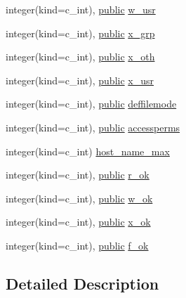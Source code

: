 \begin{DoxyCompactItemize}
\item 
integer(kind=c\+\_\+int), \hyperlink{M__stopwatch_83_8txt_a2f74811300c361e53b430611a7d1769f}{public} \hyperlink{namespacem__system_a7d9b4b9dbb20baaf8793f8fa07f7e0bc}{w\+\_\+usr}
\item 
integer(kind=c\+\_\+int), \hyperlink{M__stopwatch_83_8txt_a2f74811300c361e53b430611a7d1769f}{public} \hyperlink{namespacem__system_ad6577311415ac3c4a747b5cbbbfe1c2b}{x\+\_\+grp}
\item 
integer(kind=c\+\_\+int), \hyperlink{M__stopwatch_83_8txt_a2f74811300c361e53b430611a7d1769f}{public} \hyperlink{namespacem__system_ac931698ef74075c45e8b1e33f9302d3e}{x\+\_\+oth}
\item 
integer(kind=c\+\_\+int), \hyperlink{M__stopwatch_83_8txt_a2f74811300c361e53b430611a7d1769f}{public} \hyperlink{namespacem__system_a0674408245cc1bdfd6fcfdbe179e63f5}{x\+\_\+usr}
\item 
integer(kind=c\+\_\+int), \hyperlink{M__stopwatch_83_8txt_a2f74811300c361e53b430611a7d1769f}{public} \hyperlink{namespacem__system_ac5de3a592742c0daa16a4f367ea41c74}{deffilemode}
\item 
integer(kind=c\+\_\+int), \hyperlink{M__stopwatch_83_8txt_a2f74811300c361e53b430611a7d1769f}{public} \hyperlink{namespacem__system_aebf870d5d43a6bd77ae469c795008109}{accessperms}
\item 
integer(kind=c\+\_\+int) \hyperlink{namespacem__system_aa09d58a58be96e7d172c8c2b14744cdb}{host\+\_\+name\+\_\+max}
\item 
integer(kind=c\+\_\+int), \hyperlink{M__stopwatch_83_8txt_a2f74811300c361e53b430611a7d1769f}{public} \hyperlink{namespacem__system_a801e3ccad38d0814e4f1e62e939e9649}{r\+\_\+ok}
\item 
integer(kind=c\+\_\+int), \hyperlink{M__stopwatch_83_8txt_a2f74811300c361e53b430611a7d1769f}{public} \hyperlink{namespacem__system_a05afbb3a08aad5483f51570d6fbccd77}{w\+\_\+ok}
\item 
integer(kind=c\+\_\+int), \hyperlink{M__stopwatch_83_8txt_a2f74811300c361e53b430611a7d1769f}{public} \hyperlink{namespacem__system_a1026112f5dba28c9a8b8393524c2682f}{x\+\_\+ok}
\item 
integer(kind=c\+\_\+int), \hyperlink{M__stopwatch_83_8txt_a2f74811300c361e53b430611a7d1769f}{public} \hyperlink{namespacem__system_a88c1027ebd95e4fb92e57c5d764e5689}{f\+\_\+ok}
\end{DoxyCompactItemize}


\subsection{Detailed Description}
